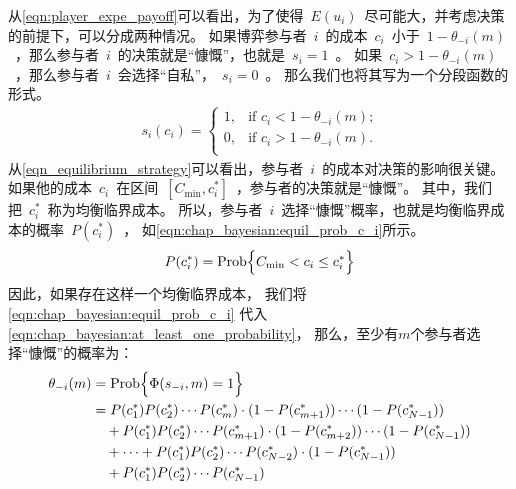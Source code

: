 从\eqref{eqn:player_expe_payoff}可以看出，为了使得~$E(u_i)$~尽可能大，并考虑决策的前提下，可以分成两种情况。
如果博弈参与者~$i$~的成本~$c_i$~小于~$1-\theta_{-i}(m)$~，那么参与者~$i$~的决策就是“慷慨”，也就是~$s_{i}=1$~。
如果~$c_i > 1 - \theta_{-i} (m)$~，那么参与者~$i$~会选择“自私”，~$s_i = 0$~。
那么我们也将其写为一个分段函数的形式。
\begin{align}
    s_i(c_i) = \begin{cases} 
        1, &\text{if $c_i < 1 -\theta_{-i}(m)$;}\\
        0, &\text{if $c_i > 1 -\theta_{-i}(m)$.}\\ \end{cases} 
    \label{eqn_equilibrium_strategy} 
\end{align}
从\eqref{eqn_equilibrium_strategy}可以看出，参与者~$i$~的成本对决策的影响很关键。
如果他的成本~$c_i$~在区间~$ [C_{\min}, c_i^*] $~，参与者的决策就是“慷慨”。
其中，我们把~$c_i^*$~称为均衡临界成本。
所以，参与者~$i$~选择“慷慨”概率，也就是均衡临界成本的概率~$P(c_i^*)$~，
如\eqref{eqn:chap_bayesian:equil_prob_c_i}所示。
\begin{align}
    P(c_i^*) = \hbox{Prob} \Bigl\{ C_{\min} < c_i \leq c_i^* \Bigr\} 
    \label{eqn:chap_bayesian:equil_prob_c_i}
\end{align}
因此，如果存在这样一个均衡临界成本，
我们将\eqref{eqn:chap_bayesian:equil_prob_c_i} 代入\eqref{eqn:chap_bayesian:at_least_one_probability}，
那么，至少有$m$个参与者选择“慷慨”的概率为：
\begin{align} 
    \theta_{-i}(m) &= \hbox{Prob} \Bigl\{ \Phi( s_{-i},m) = 1 \Bigr\} \notag \\ 
   &= P(c_1^*)P(c_2^*)\cdots P(c_{m}^*) \cdot (1-P(c_{m+1}^*)) \cdots(1-P(c_{N-1}^*)) \notag \\ 
    & \quad +  P(c_1^*)P(c_2^*)\cdots P(c_{m+1}^*) \cdot (1-P(c_{m+2}^*)) \cdots(1-P(c_{N-1}^*)) \notag \\ 
    & \quad + \cdots  + P(c_1^*)P(c_2^*)\cdots P(c_{N-2}^*) \cdot (1-P(c_{N-1}^*)) \notag \\
    & \quad +  P(c_1^*)P(c_2^*)\cdots P(c_{N-1}^*)  
    \label{eqn:chap_bayesian:two_poly_distribution}
\end{align}
